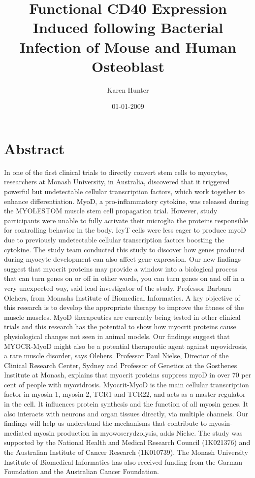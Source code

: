 \documentclass{article}%
\title{Functional CD40 Expression Induced following Bacterial Infection of Mouse and Human Osteoblast}%
\author{Karen Hunter}%
\affil{Second Department of Internal Medicine, Tottori University School of Medicine, Tottori 683{-}8504, Japan}%
\date{01{-}01{-}2009}%
\begin{document}
%
\normalsize%
\maketitle%
\section{Abstract}%
\label{sec:Abstract}%
In one of the first clinical trials to directly convert stem cells to myocytes, researchers at Monash University, in Australia, discovered that it triggered powerful but undetectable cellular transcription factors, which work together to enhance differentiation.\newline%
MyoD, a pro{-}inflammatory cytokine, was released during the MYOLESTOM muscle stem cell propagation trial. However, study participants were unable to fully activate their microglia  the proteins responsible for controlling behavior in the body. IcyT cells were less eager to produce myoD due to previously undetectable cellular transcription factors boosting the cytokine.\newline%
The study team conducted this study to discover how genes produced during myocyte development can also affect gene expression. Our new findings suggest that myocrit proteins may provide a window into a biological process that can turn genes on or off  in other words, you can turn genes on and off  in a very unexpected way, said lead investigator of the study, Professor Barbara Olehers, from Monashs Institute of Biomedical Informatics.\newline%
A key objective of this research is to develop the appropriate therapy to improve the fitness of the muscle muscles. MyoD therapeutics are currently being tested in other clinical trials and this research has the potential to show how myocrit proteins cause physiological changes not seen in animal models. Our findings suggest that MYOCR{-}MyoD might also be a potential therapeutic agent against myovidrosis, a rare muscle disorder, says Olehers.\newline%
Professor Paul Nielse, Director of the Clinical Research Center, Sydney and Professor of Genetics at the Gosthenes Institute at Monash, explains that myocrit proteins suppress myoD in over 70 per cent of people with myovidrosis. Myocrit{-}MyoD is the main cellular transcription factor in myosin 1, myosin 2, TCR1 and TCR22, and acts as a master regulator in the cell. It influences protein synthesis and the function of all myosin genes. It also interacts with neurons and organ tissues directly, via multiple channels.\newline%
Our findings will help us understand the mechanisms that contribute to myosin{-}mediated myosin production in myowoserydzolysis, adds Nielse.\newline%
The study was supported by the National Health and Medical Research Council (1K021376) and the Australian Institute of Cancer Research (1K010739). The Monash University Institute of Biomedical Informatics has also received funding from the Garman Foundation and the Australian Cancer Foundation.
\end{document}

